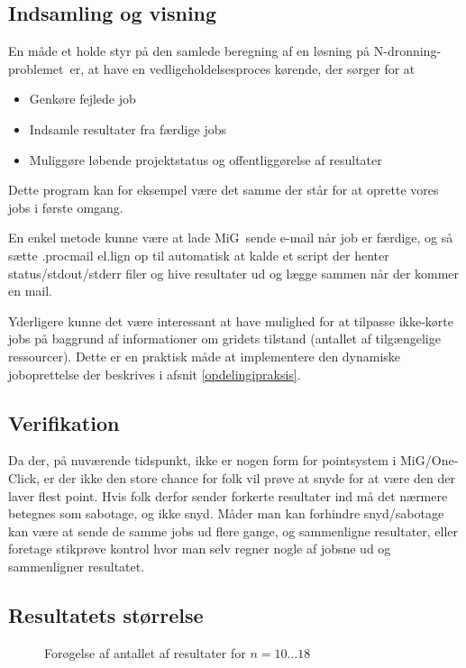 \documentclass[draft,a4paper,11pt]{article}
\newcommand{\mig}{MiG}
\newcommand{\oc}{One-Click}
\newcommand{\nq}{N-dronning-problemet}
\begin{document}
\subsection{Indsamling og visning}
En måde et holde styr på den samlede beregning af en løsning på \nq\ er, at have en vedligeholdelsesproces kørende, der sørger for at 
\begin{itemize}
	\item Genkøre fejlede job
	\item Indsamle resultater fra færdige jobs
	\item Muliggøre løbende projektstatus og offentliggørelse af resultater 
\end{itemize}
Dette program kan for eksempel være det samme der står for at oprette vores jobs i første omgang. 

En enkel metode kunne være at lade \mig\ sende e-mail når job er færdige, og så sætte .procmail el.lign op til automatisk at kalde et script der henter status/stdout/stderr filer og hive resultater ud og lægge sammen når der
kommer en mail.

Yderligere kunne det være interessant at have mulighed for at tilpasse ikke-kørte jobs på baggrund af informationer om gridets tilstand (antallet af tilgængelige ressourcer). Dette er en praktisk måde at implementere den dynamiske joboprettelse der beskrives i afsnit \ref{opdelingipraksis}. 

\subsection{Verifikation}
Da der, på nuværende tidspunkt, ikke er nogen form for pointsystem i \mig/\oc,
er der ikke den store chance for folk vil prøve at snyde for at være den der
laver flest point. Hvis folk derfor sender forkerte resultater ind må det
nærmere betegnes som sabotage, og ikke snyd. Måder man kan forhindre
snyd/sabotage kan være at sende de samme jobs ud flere gange, og sammenligne
resultater, eller foretage stikprøve kontrol hvor man selv regner nogle af
jobsne ud og sammenligner resultatet. 

\subsection{Resultatets størrelse}
\begin{figure}
\caption{Forøgelse af antallet af resultater for $n=10\ldots18$}
\label{solrelativecount}
\end{figure}
\end{document}

